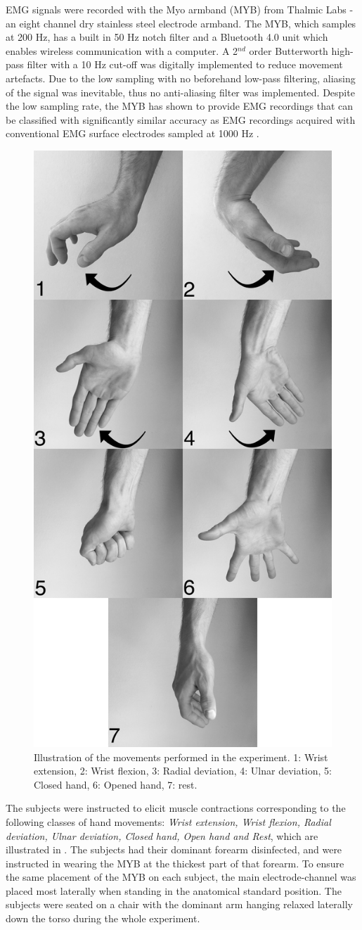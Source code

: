 EMG signals were recorded with the Myo armband (MYB) from Thalmic Labs - an eight channel dry stainless steel electrode armband. The MYB, which samples at 200 Hz, has a built in 50 Hz notch filter and a Bluetooth 4.0 unit which enables wireless communication with a computer. A 2$^{nd}$ order Butterworth high-pass filter with a 10 Hz cut-off was digitally implemented to reduce movement artefacts. Due to the low sampling with no beforehand low-pass filtering, aliasing of the signal was inevitable, thus no anti-aliasing filter was implemented. Despite the low sampling rate, the MYB has shown to provide EMG recordings that can be classified with significantly similar accuracy as EMG recordings acquired with conventional EMG surface electrodes sampled at 1000 Hz \cite{Mendez2017}. \\
\begin{figure}[H]                 
	\includegraphics[width=.35\textwidth]{figures/Paper/allHandMovementsVerticalBW}  
	\caption{Illustration of the movements performed in the experiment. 1: Wrist extension, 2: Wrist flexion, 3: Radial deviation, 4: Ulnar deviation, 5: Closed hand, 6: Opened hand, 7: rest.}
	\label{fig:P:experiment_movements} 
\end{figure}
The subjects were instructed to elicit muscle contractions corresponding to the following classes of hand movements: \textit{Wrist extension, Wrist flexion, Radial deviation, Ulnar deviation, Closed hand, Open hand and Rest}, which are illustrated in . The subjects had their dominant forearm disinfected, and were instructed in wearing the MYB at the thickest part of that forearm. To ensure the same placement of the MYB on each subject, the main electrode-channel was placed most laterally when standing in the anatomical standard position. The subjects were seated on a chair with the dominant arm hanging relaxed laterally down the torso during the whole experiment. \\

